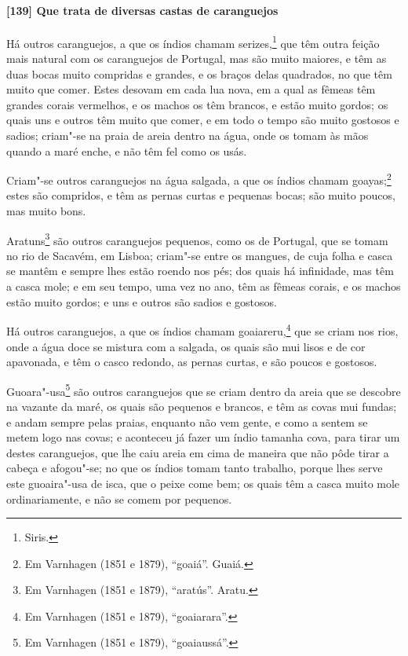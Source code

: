 \paragraph{[139] Que trata de diversas castas de caranguejos}\quad
Há outros caranguejos, a que os índios chamam serizes,\footnote{ Siris.} que têm outra
feição mais natural com os caranguejos de Portugal, mas são muito maiores, e têm as duas
bocas muito compridas e grandes, e os braços delas quadrados, no que têm muito que comer.
Estes desovam em cada lua nova, em a qual as fêmeas têm grandes corais vermelhos, e os
machos os têm brancos, e estão muito gordos; os quais uns e outros têm muito que comer, e
em todo o tempo são muito gostosos e sadios; criam"-se na praia de areia dentro na água,
onde os tomam às mãos quando a maré enche, e não têm fel como os usás.

Criam"-se outros caranguejos na água salgada, a que os índios chamam goayas;\footnote{ Em
Varnhagen (1851 e 1879), ``goaiá''. Guaiá.} estes são compridos, e têm as pernas curtas e
pequenas bocas; são muito poucos, mas muito bons.

Aratuns\footnote{ Em Varnhagen (1851 e 1879), ``aratús''. Aratu.} são outros caranguejos
pequenos, como os de Portugal, que se tomam no rio de Sacavém, em Lisboa; criam"-se entre
os mangues, de cuja folha e casca se mantêm e sempre lhes estão roendo nos pés; dos quais
há infinidade, mas têm a casca mole; e em seu tempo, uma vez no ano, têm as fêmeas corais,
e os machos estão muito gordos; e uns e outros são sadios e gostosos.

Há outros caranguejos, a que os índios chamam goaiareru,\footnote{ Em Varnhagen (1851 e
1879), ``goaiarara''.} que se criam nos rios, onde a água doce se mistura com a salgada,
os quais são mui lisos e de cor apavonada, e têm o casco redondo, as pernas curtas, e são
poucos e gostosos.

Guoara"-usa\footnote{ Em Varnhagen (1851 e 1879), ``goaiaussá''.} são outros caranguejos
que se criam dentro da areia que se descobre na vazante da maré, os quais são pequenos e
brancos, e têm as covas mui fundas; e andam sempre pelas praias, enquanto não vem gente, e
como a sentem se metem logo nas covas; e aconteceu já fazer um índio tamanha cova, para
tirar um destes caranguejos, que lhe caiu areia em cima de maneira que não pôde tirar a
cabeça e afogou"-se; no que os índios tomam tanto trabalho, porque lhes serve este
guoaira"-usa de isca, que o peixe come bem; os quais têm a casca muito mole ordinariamente,
e não se comem por pequenos.

